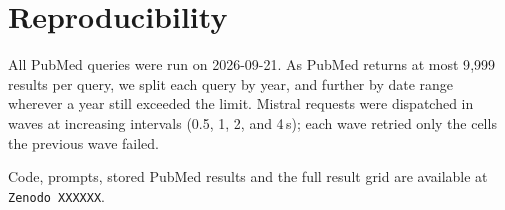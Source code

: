 \documentclass[openacc]{rstb}
\begin{document}
\section{Reproducibility}

All PubMed queries were run on 2026-09-21.
As PubMed returns at most 9{,}999 results per query, we split each query by year, and further by date range wherever a year still exceeded the limit.
Mistral requests were dispatched in waves at increasing intervals (0.5, 1, 2, and 4\,s); each wave retried only the cells the previous wave failed.

Code, prompts, stored PubMed results and the full result grid are available at \texttt{Zenodo XXXXXX}.




\end{document}
